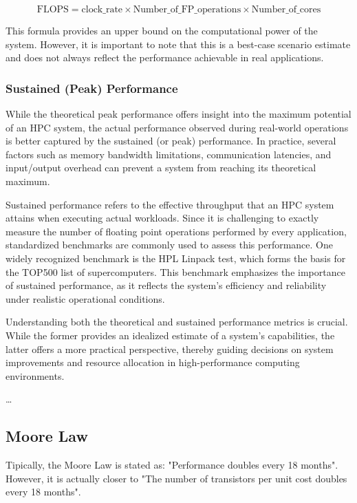 $$
\text{FLOPS} = \text{clock\_rate} \times \text{Number\_of\_FP\_operations} \times \text{Number\_of\_cores}
$$

This formula provides an upper bound on the computational power of the system. However, it is important to note that this is a best-case scenario estimate and does not always reflect the performance achievable in real applications.

\subsubsection{Sustained (Peak) Performance} \label{sec:sustained}

While the theoretical peak performance offers insight into the maximum potential of an HPC system, the actual performance observed during real-world operations is better captured by the sustained (or peak) performance. In practice, several factors such as memory bandwidth limitations, communication latencies, and input/output overhead can prevent a system from reaching its theoretical maximum.

Sustained performance refers to the effective throughput that an HPC system attains when executing actual workloads. Since it is challenging to exactly measure the number of floating point operations performed by every application, standardized benchmarks are commonly used to assess this performance. One widely recognized benchmark is the HPL Linpack test, which forms the basis for the TOP500 list of supercomputers. This benchmark emphasizes the importance of sustained performance, as it reflects the system’s efficiency and reliability under realistic operational conditions.

Understanding both the theoretical and sustained performance metrics is crucial. While the former provides an idealized estimate of a system's capabilities, the latter offers a more practical perspective, thereby guiding decisions on system improvements and resource allocation in high-performance computing environments.


\dots

\subsection{Moore Law}

Tipically, the Moore Law is stated as: "Performance doubles every 18 months". However, it is actually closer to "The number of transistors per unit cost doubles every 18 months".

